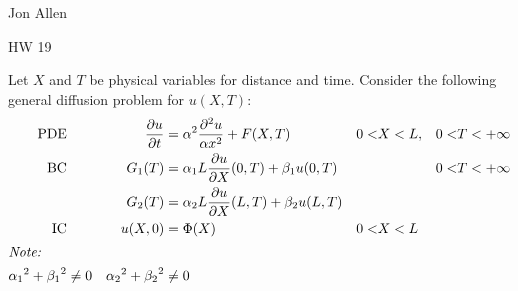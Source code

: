\documentclass{article}
\begin{document}
Jon Allen

HW 19

Let $X$ and $T$ be physical variables for distance and time. Consider the following general diffusion problem for $u(X,T)$:
\begin{align*}
  \text{PDE}&&\frac{\partial u}{\partial t}&=\alpha^2\frac{\partial^2u}{\alpha x^2}+F(X,T)&0<&X<L,&0<&T<+\infty\\
  \text{BC}&&G_1(T)&=\alpha_1L\frac{\partial u}{\partial X}(0,T)+\beta _1u(0,T)&&&0<&T<+\infty\\
  &&G_2(T)&=\alpha_2L\frac{\partial u}{\partial X}(L,T)+\beta_2u(L,T)\\
  \text{IC}&&u(X,0)&=\Phi(X)&0<&X<L\\
  \intertext{\emph{Note:}}
  {\alpha_1}^2+{\beta_1}^2&\ne0&
  {\alpha_2}^2+{\beta_2}^2&\ne0\\
\end{align*}
\end{document}
